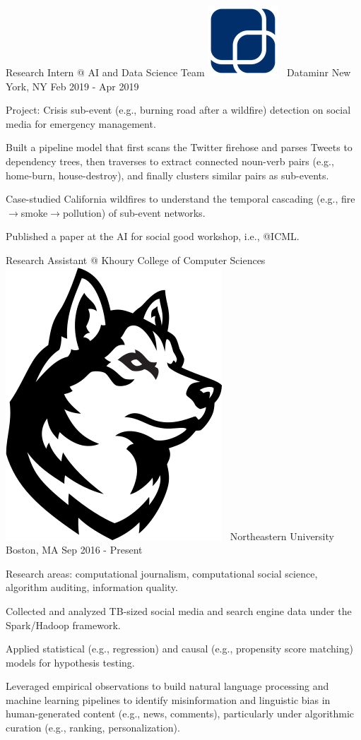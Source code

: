 \documentclass[letterpaper]{awesome-cv}
\begin{document}
\begin{cventries}
{\begin{cvitems}
      \end{cvitems}
    }
  \cventry
    {Research Intern @ AI and Data Science Team}
    {\includegraphics[height=0.017\textwidth]{../images/logos/dataminr.png}~ Dataminr}
    {New York, NY}
    {Feb 2019 - Apr 2019}
    {
      \begin{cvitems}
        \item {Project: Crisis sub-event (e.g., burning road after a wildfire) detection on social media for emergency management.}
        \item {Built a pipeline model that first scans the Twitter firehose and parses Tweets to dependency trees, then traverses to extract connected noun-verb pairs (e.g., home-burn, house-destroy), and finally clusters similar pairs as sub-events.}
        \item {Case-studied California wildfires to understand the temporal cascading (e.g., fire$\to$smoke$\to$pollution) of sub-event networks.}
        \item {Published a paper at the AI for social good workshop, i.e., @ICML.}
      \end{cvitems}
    }
  \cventry
    {Research Assistant @ Khoury College of Computer Sciences}
    {\includegraphics[height=0.02\textwidth]{../images/logos/northeastern.png}~ Northeastern University}
    {Boston, MA}
    {Sep 2016 - Present}
    {
      \begin{cvitems}
        \item {Research areas: computational journalism, computational social science, algorithm auditing, information quality.}
        \item {Collected and analyzed TB-sized social media and search engine data under the Spark/Hadoop framework.}
        \item {Applied statistical (e.g., regression) and causal (e.g., propensity score matching) models for hypothesis testing.}
        \item {Leveraged empirical observations to build natural language processing and machine learning pipelines to identify misinformation and linguistic bias in human-generated content (e.g., news, comments), particularly under algorithmic curation (e.g., ranking, personalization).}

\end{cvitems}}
\end{cventries}
\end{document}
